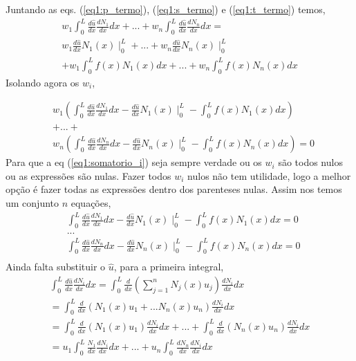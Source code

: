 %
%
Juntando as eqs. (\ref{eq1:p_termo}), (\ref{eq1:s_termo}) e (\ref{eq1:t_termo}) temos,
%
\begin{equation}
	\begin{split}
    w_1 \int_0^L \frac{d \hat u}{dx}  \frac{dN_1}{dx} dx + ... + w_n \int_0^L \frac{d \hat u}{dx}  \frac{dN_n}{dx}  dx =\\
    w_1  \frac{d \hat u}{dx} N_1(x) \mid_0^L + ... + w_n \frac{d \hat u}{dx} N_n(x) \mid_0^L \\
    + w_1 \int_0^L f(x) N_1(x) dx + ... + w_n \int_0^L f(x) N_n(x) dx
	\end{split}
\end{equation}
%
Isolando agora os $w_i$,

\begin{equation}
	\begin{split}
		&w_1 \left(\int_0^L \frac{d \hat u}{dx}  \frac{dN_1}{dx} dx -  \frac{d \hat u}{dx} N_1(x) \mid_0^L -\int_0^L f(x) N_1(x) dx \right)\\
		&+ ... + \\
		&w_n \left(\int_0^L \frac{d \hat u}{dx}  \frac{dN_n}{dx} dx -  \frac{d \hat u}{dx} N_n(x) \mid_0^L -\int_0^L f(x) N_n(x) dx \right) = 0
	\end{split}
	\label{eq1:somatorio_i}
\end{equation}
%
Para que a eq (\ref{eq1:somatorio_i}) seja sempre verdade ou os $w_i$ são todos nulos ou as expressões são nulas. Fazer todos $w_i$ nulos não tem utilidade, logo a melhor opção é fazer todas as expressões dentro dos parenteses nulas. Assim nos temos um conjunto $n$ equações,
%
\begin{equation}
	\begin{split}
		&\int_0^L \frac{d \hat u}{dx}  \frac{dN_1}{dx} dx -  \frac{d \hat u}{dx} N_1(x) \mid_0^L -\int_0^L f(x) N_1(x) dx  = 0\\
		&...\\
		&\int_0^L \frac{d \hat u}{dx}  \frac{dN_n}{dx} dx -  \frac{d \hat u}{dx} N_n(x) \mid_0^L -\int_0^L f(x) N_n(x) dx  = 0\\
	\end{split}
	\label{eq1:equacoes_i}
\end{equation} 
%
Ainda falta substituir o $\hat u$, para a primeira integral,
%
\begin{equation}
	\begin{split}
	\int_0^L \frac{d \hat u}{dx}  \frac{dN_i}{dx} dx = \int_0^L \frac{d}{dx}\left(\sum_{j = 1}^n N_j(x) u_j\right)  \frac{dN_i}{dx} dx\\
	 = \int_0^L \frac{d}{dx} \left( N_1(x) u_1 + ... N_n(x) u_n \right) \frac{dN_i}{dx} dx\\
	 = \int_0^L \frac{d}{dx} \left( N_1(x) u_1 \right) \frac{dN_i}{dx} dx + ... + \int_0^L \frac{d}{dx} \left( N_n(x) u_n \right) \frac{dN_i}{dx} dx\\
	 = u_1 \int_0^L \frac{N_1}{dx} \frac{dN_i}{dx} dx + ... + u_n \int_0^L \frac{d N_n}{dx} \frac{dN_i}{dx} dx
	\end{split}
\end{equation} 
